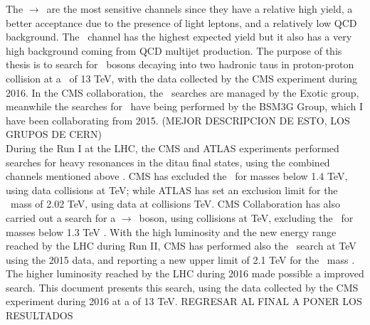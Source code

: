 The \Zprime$\rightarrow$\tauell\tauh~are the most sensitive channels since they have 
a relative high yield, a better acceptance due to the presence of light leptons, and a relatively
low QCD background. The \Zprimetotauh~channel has the highest 
expected yield but it also has a very high background coming 
from QCD multijet production. The purpose of this thesis is to search for \Zprime~bosons decaying into two hadronic taus 
in proton-proton collision at a \centermassenergy~of 13 TeV, with the data collected by the 
CMS  experiment during 2016. In the CMS collaboration, the \Zprime~searches 
are managed by the Exotic group, meanwhile the searches for \Zprimetotautau~have 
being performed by the BSM3G Group, which I have been collaborating from 2015. (MEJOR DESCRIPCION DE ESTO, LOS GRUPOS DE CERN)\\


During the Run I at the LHC, the CMS and ATLAS experiments performed searches for heavy resonances 
in the ditau final states, using the combined channels mentioned above \cite{CMSZprime2ditaubib,ATLASZprime2ditaubib}.
CMS has excluded the \ZprimeSSM~for masses below 1.4 TeV, using data collisions at  TeV; while ATLAS 
has set an exclusion limit for the \ZprimeSSM~mass of 2.02 TeV, using data at collisions  TeV. 
CMS Collaboration has also carried out a search for a \Zprime$\rightarrow$\taue\taumu~boson, using collisions at  TeV, excluding
the \ZprimeSSM~for masses below 1.3 TeV \cite{CMSZprime2ditauelectronmuonbib}. With the high luminosity and the new energy range 
reached by the LHC during Run II, CMS has performed also the \Zprimetotautau~search at  TeV using the 2015 data, and reporting 
a new upper limit of 2.1 TeV for the \ZprimeSSM~mass \cite{CMSZprime2tausRunII}. The higher luminosity reached 
by the LHC during 2016 made possible a improved search. This document presents this search, using 
the data collected by the CMS experiment during 2016 at a \centermassenergy of 13 TeV. REGRESAR AL FINAL A PONER LOS RESULTADOS\\


